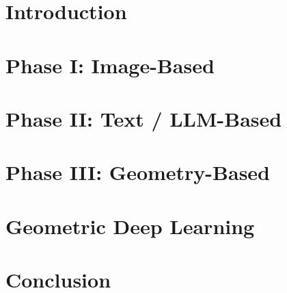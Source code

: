 

\section[Intro]{Introduction}


\ifshowImage
\section[Phase I]{Phase I: Image-Based}


\fi

\ifshowText
\section[Phase II]{Phase II: Text / LLM-Based}

\fi

\ifshowGraph
\section[Phase III]{Phase III: Geometry-Based}

\fi

\ifshowGDL
\section[GDL]{Geometric Deep Learning}

\ifshowGDLResults

\fi
\fi

\section[End]{Conclusion}


